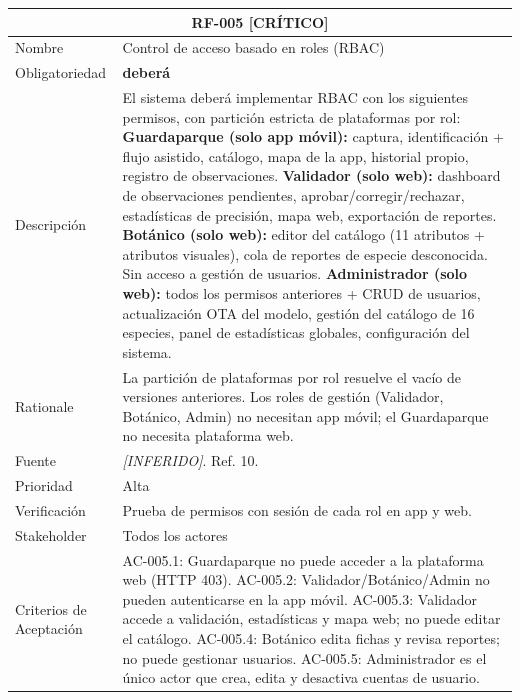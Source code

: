 \documentclass[12pt, a4paper]{article}
\newcommand{\criticomark}{\textcolor{criticolor}{\textbf{[CR\'ITICO]}}}
\newcommand{\inferido}{\textcolor{medio}{\textit{[INFERIDO]}}}
\begin{document}
\begin{longtable}{|p{3cm}|p{11.5cm}|}
\hline
\multicolumn{2}{|c|}{\textbf{RF-005} \criticomark} \\
\hline
Nombre & Control de acceso basado en roles (RBAC) \\
\hline
Obligatoriedad & \textbf{deber\'a} \\
\hline
Descripci\'on & El sistema deber\'a implementar RBAC con los siguientes permisos, con partici\'on estricta de plataformas por rol:\newline
\textbf{Guardaparque (solo app m\'ovil):} captura, identificaci\'on + flujo asistido, cat\'alogo, mapa de la app, historial propio, registro de observaciones.\newline
\textbf{Validador (solo web):} dashboard de observaciones pendientes, aprobar/corregir/rechazar, estad\'isticas de precisi\'on, mapa web, exportaci\'on de reportes.\newline
\textbf{Bot\'anico (solo web):} editor del cat\'alogo (11 atributos + atributos visuales), cola de reportes de especie desconocida. Sin acceso a gesti\'on de usuarios.\newline
\textbf{Administrador (solo web):} todos los permisos anteriores + CRUD de usuarios, actualizaci\'on OTA del modelo, gesti\'on del cat\'alogo de 16 especies, panel de estad\'isticas globales, configuraci\'on del sistema. \\
\hline
Rationale & La partici\'on de plataformas por rol resuelve el vac\'io de versiones anteriores. Los roles de gesti\'on (Validador, Bot\'anico, Admin) no necesitan app m\'ovil; el Guardaparque no necesita plataforma web. \\
\hline
Fuente & \inferido{}. Ref. 10. \\
\hline
Prioridad & Alta \\
\hline
Verificaci\'on & Prueba de permisos con sesi\'on de cada rol en app y web. \\
\hline
Stakeholder & Todos los actores \\
\hline
Criterios de Aceptaci\'on &
AC-005.1: Guardaparque no puede acceder a la plataforma web (HTTP 403). \newline
AC-005.2: Validador/Bot\'anico/Admin no pueden autenticarse en la app m\'ovil. \newline
AC-005.3: Validador accede a validaci\'on, estad\'isticas y mapa web; no puede editar el cat\'alogo. \newline
AC-005.4: Bot\'anico edita fichas y revisa reportes; no puede gestionar usuarios. \newline
AC-005.5: Administrador es el \'unico actor que crea, edita y desactiva cuentas de usuario. \\
\hline
\end{longtable}
\end{document}
